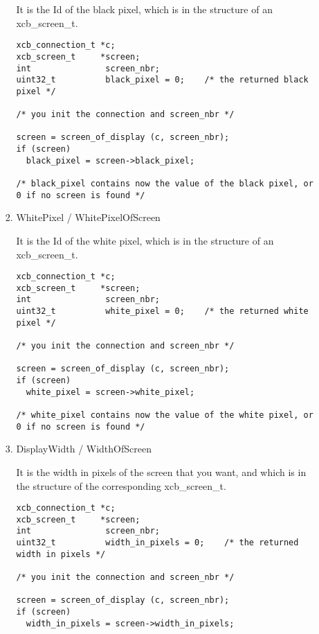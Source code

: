\documentclass[12pt,oneside,titlepage]{book}
\begin{document}
\begin{enumerate}
\begin{enumerate}
\begin{enumerate}
      It is the Id of the black pixel, which is in the structure of an
      {xcb\_screen\_t}.

\begin{verbatim}
xcb_connection_t *c;
xcb_screen_t     *screen;
int               screen_nbr;
uint32_t          black_pixel = 0;    /* the returned black pixel */

/* you init the connection and screen_nbr */

screen = screen_of_display (c, screen_nbr);
if (screen)
  black_pixel = screen->black_pixel;

/* black_pixel contains now the value of the black pixel, or 0 if no screen is found */
\end{verbatim}
    \item
      \protect\hypertarget{WhitePixel}{}{WhitePixel /
      WhitePixelOfScreen}

      It is the Id of the white pixel, which is in the structure of an
      {xcb\_screen\_t}.

\begin{verbatim}
xcb_connection_t *c;
xcb_screen_t     *screen;
int               screen_nbr;
uint32_t          white_pixel = 0;    /* the returned white pixel */

/* you init the connection and screen_nbr */

screen = screen_of_display (c, screen_nbr);
if (screen)
  white_pixel = screen->white_pixel;

/* white_pixel contains now the value of the white pixel, or 0 if no screen is found */
\end{verbatim}
    \item
      \protect\hypertarget{DisplayWidth}{}{DisplayWidth / WidthOfScreen}

      It is the width in pixels of the screen that you want, and which
      is in the structure of the corresponding {xcb\_screen\_t}.

\begin{verbatim}
xcb_connection_t *c;
xcb_screen_t     *screen;
int               screen_nbr;
uint32_t          width_in_pixels = 0;    /* the returned width in pixels */

/* you init the connection and screen_nbr */

screen = screen_of_display (c, screen_nbr);
if (screen)
  width_in_pixels = screen->width_in_pixels;


\end{verbatim}
\end{enumerate}
\end{enumerate}
\end{enumerate}
\end{document}
